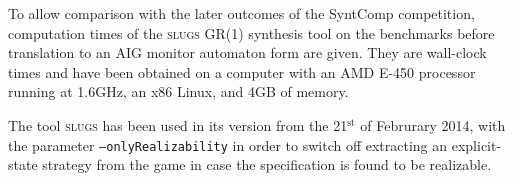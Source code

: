 \documentclass[a4paper,conference,10pt]{IEEEtran}
\begin{document}
To allow comparison with the later outcomes of the SyntComp competition, computation times of the \textsc{slugs} GR(1) synthesis tool on the benchmarks before translation to an AIG monitor automaton form are given. They are wall-clock times and have been obtained on a computer with an AMD E-450 processor running at 1.6GHz, an x86 Linux, and 4GB of memory.

The tool \textsc{slugs} has been used in its version from the 21$^\mathrm{st}$ of Februrary 2014, with the parameter \texttt{--onlyRealizability} in order to switch off extracting an explicit-state strategy from the game in case the specification is found to be realizable.



\end{document}
